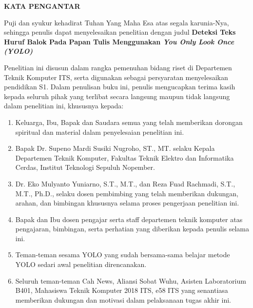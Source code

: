 \begin{center}
  \Large
  \textbf{KATA PENGANTAR}
\end{center}


\vspace{2ex}


Puji dan syukur kehadirat Tuhan Yang Maha Esa atas segala karunia-Nya, sehingga penulis dapat menyelesaikan penelitian dengan judul \textbf{Deteksi Teks Huruf Balok Pada Papan Tulis Menggunakan \emph{You Only Look Once (YOLO)}}

Penelitian ini disusun dalam rangka pemenuhan bidang riset di Departemen Teknik Komputer ITS, serta digunakan sebagai persyaratan menyelesaikan pendidikan S1. Dalam penulisan buku ini, penulis mengucapkan terima kasih kepada seluruh pihak yang terlibat secara langsung maupun tidak langsung dalam penelitian ini, khususnya kepada:

\begin{enumerate}[nolistsep]

  \item Keluarga, Ibu, Bapak dan Saudara semua yang telah memberikan dorongan spiritual dan material dalam penyelesaian penelitian ini.

  \item Bapak Dr. Supeno Mardi Susiki Nugroho, ST., MT. selaku Kepala Departemen Teknik Komputer, Fakultas Teknik Elektro dan Informatika Cerdas, Institut Teknologi Sepuluh Nopember.

  \item Dr. Eko Mulyanto Yuniarno, S.T., M.T., dan Reza Fuad Rachmadi, S.T., M.T., Ph.D., selaku dosen pembimbing yang telah memberikan dukungan, arahan, dan bimbingan khususnya selama proses pengerjaan penelitian ini.
  
  \item Bapak dan Ibu dosen pengajar serta staff departemen teknik komputer atas pengajaran, bimbingan, serta perhatian yang diberikan kepada penulis selama ini.
  
  
  \item Teman-teman sesama YOLO yang sudah bersama-sama belajar metode YOLO sedari awal penelitian direncanakan.

  \item Seluruh teman-teman Cah News, Aliansi Sobat Wuhu, Asisten Laboratorium B401, Mahasiswa Teknik Komputer 2018 ITS, e58 ITS yang senantiasa memberikan dukungan dan motivasi dalam pelaksanaan tugas akhir ini.

\end{enumerate}

